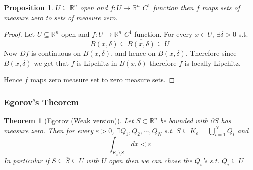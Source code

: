 \documentclass[11pt,a4paper]{article}
\theoremstyle{definition}
\theoremstyle{plain}
\newtheorem{theorem}[definition]{Theorem}
\newtheorem{proposition}[definition]{Proposition}
\theoremstyle{remark}
\newcommand{\R}{\mathbb{R}}
\begin{document}
\begin{proposition}
    $U \subseteq \R^n$ open and $f \colon U \to \R^n$ $C^1$ function then $f$ maps sets of measure zero to sets of measure zero. 
\end{proposition}

\begin{proof}
    Let $U \subseteq \R^n$ open and $f \colon U \to \R^n$ $C^1$ function. For every $x \in U$, $\exists \delta > 0$ s.t.
    $$B(x, \delta) \subseteq \overline{B(x, \delta)} \subseteq U$$
    Now $Df$ is continuous on $\overline{B(x,\delta)}$, and hence on $B(x,\delta)$. Therefore 
    since $B(x, \delta)$ we get that $f$ is Lipchitz in $B(x, \delta)$ therefore $f$ is locally Lipchitz. 
    
    Hence $f$ maps zero measure set to zero measure sets. 
\end{proof}

\subsubsection{Egorov's Theorem}

\begin{theorem}[Egorov (Weak version)]
    Let $S \subset \R^n$ be bounded with $\partial S$ has measure zero. Then for every $\varepsilon > 0$, $\exists Q_1, Q_2, \cdots, Q_N$ 
    s.t. $S \subseteq K_\varepsilon = \bigcup_{i=1}^N Q_i$ and 
    $$\int_{K_\varepsilon \setminus S} \ dx < \varepsilon$$ 
    In particular if $S \subseteq \overline{S} \subseteq U$ with $U$ open then we can chose the $Q_i$'s s.t. 
    $Q_i \subseteq U$
\end{theorem}
\end{document}
